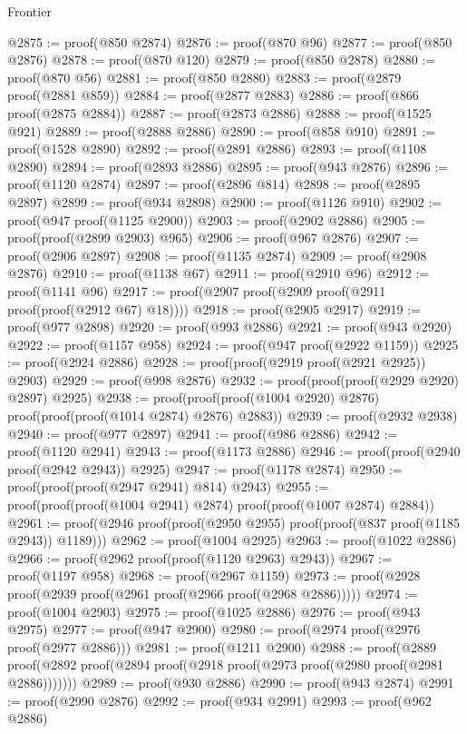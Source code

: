 \begin{lexlean}{Frontier}
\begin{coremodule}
@2875 := proof(@850 @2874)
@2876 := proof(@870 @96)
@2877 := proof(@850 @2876)
@2878 := proof(@870 @120)
@2879 := proof(@850 @2878)
@2880 := proof(@870 @56)
@2881 := proof(@850 @2880)
@2883 := proof(@2879 proof(@2881 @859))
@2884 := proof(@2877 @2883)
@2886 := proof(@866 proof(@2875 @2884))
@2887 := proof(@2873 @2886)
@2888 := proof(@1525 @921)
@2889 := proof(@2888 @2886)
@2890 := proof(@858 @910)
@2891 := proof(@1528 @2890)
@2892 := proof(@2891 @2886)
@2893 := proof(@1108 @2890)
@2894 := proof(@2893 @2886)
@2895 := proof(@943 @2876)
@2896 := proof(@1120 @2874)
@2897 := proof(@2896 @814)
@2898 := proof(@2895 @2897)
@2899 := proof(@934 @2898)
@2900 := proof(@1126 @910)
@2902 := proof(@947 proof(@1125 @2900))
@2903 := proof(@2902 @2886)
@2905 := proof(proof(@2899 @2903) @965)
@2906 := proof(@967 @2876)
@2907 := proof(@2906 @2897)
@2908 := proof(@1135 @2874)
@2909 := proof(@2908 @2876)
@2910 := proof(@1138 @67)
@2911 := proof(@2910 @96)
@2912 := proof(@1141 @96)
@2917 := proof(@2907 proof(@2909 proof(@2911 proof(proof(@2912 @67) @18))))
@2918 := proof(@2905 @2917)
@2919 := proof(@977 @2898)
@2920 := proof(@993 @2886)
@2921 := proof(@943 @2920)
@2922 := proof(@1157 @958)
@2924 := proof(@947 proof(@2922 @1159))
@2925 := proof(@2924 @2886)
@2928 := proof(proof(@2919 proof(@2921 @2925)) @2903)
@2929 := proof(@998 @2876)
@2932 := proof(proof(proof(@2929 @2920) @2897) @2925)
@2938 := proof(proof(proof(@1004 @2920) @2876) proof(proof(proof(@1014 @2874) @2876) @2883))
@2939 := proof(@2932 @2938)
@2940 := proof(@977 @2897)
@2941 := proof(@986 @2886)
@2942 := proof(@1120 @2941)
@2943 := proof(@1173 @2886)
@2946 := proof(proof(@2940 proof(@2942 @2943)) @2925)
@2947 := proof(@1178 @2874)
@2950 := proof(proof(proof(@2947 @2941) @814) @2943)
@2955 := proof(proof(proof(@1004 @2941) @2874) proof(proof(@1007 @2874) @2884))
@2961 := proof(@2946 proof(proof(@2950 @2955) proof(proof(@837 proof(@1185 @2943)) @1189)))
@2962 := proof(@1004 @2925)
@2963 := proof(@1022 @2886)
@2966 := proof(@2962 proof(proof(@1120 @2963) @2943))
@2967 := proof(@1197 @958)
@2968 := proof(@2967 @1159)
@2973 := proof(@2928 proof(@2939 proof(@2961 proof(@2966 proof(@2968 @2886)))))
@2974 := proof(@1004 @2903)
@2975 := proof(@1025 @2886)
@2976 := proof(@943 @2975)
@2977 := proof(@947 @2900)
@2980 := proof(@2974 proof(@2976 proof(@2977 @2886)))
@2981 := proof(@1211 @2900)
@2988 := proof(@2889
      proof(@2892 proof(@2894 proof(@2918 proof(@2973 proof(@2980 proof(@2981 @2886)))))))
@2989 := proof(@930 @2886)
@2990 := proof(@943 @2874)
@2991 := proof(@2990 @2876)
@2992 := proof(@934 @2991)
@2993 := proof(@962 @2886)

\end{coremodule}
\end{lexlean}
